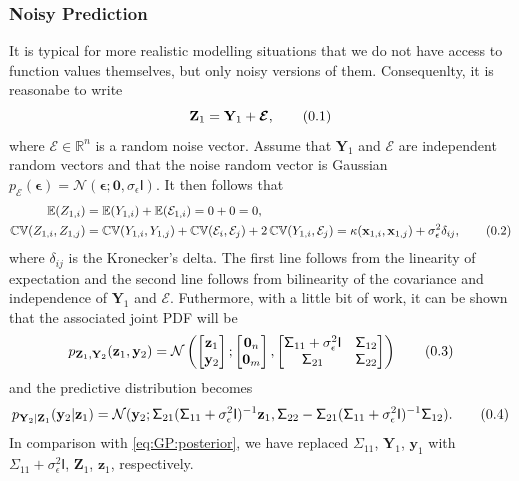 \documentclass[10pt]{article}
\theoremstyle{definition}
\newcommand\eqnum{\addtocounter{equation}{1}\tag{\arabic{section}.\arabic{equation}}}
\DeclareMathOperator{\cov}{\mathbb{CV}}
\begin{document}
\subsubsection{Noisy Prediction}
It is typical for more realistic modelling situations that we do not have access to function values themselves, but only noisy versions of them. Consequenlty, it is reasonabe to write
\begin{equation*}
\mathbf{Z}_{1} = \mathbf{Y}_{1} + \boldsymbol{\mathcal{E}},
\eqnum
\end{equation*}
where $\boldsymbol{\mathcal{E}}\in\mathbb{R}^n$ is a random noise vector. Assume that $\mathbf{Y}_1$ and $\boldsymbol{\mathcal{E}}$ are independent random vectors and that the noise random vector is Gaussian $p_{\boldsymbol{\mathcal{E}}}(\boldsymbol{\epsilon})=\mathcal{N}(\boldsymbol{\epsilon}; \mathbf{0}, \sigma_{\epsilon}\mathsf{I})$. It then follows that
 \begin{align*}
 \mathbb{E}(Z_{1,i}) &=  \mathbb{E}(Y_{1,i}) +  \mathbb{E}(\mathcal{E}_{1,i}) = 0 + 0 = 0, \\
 \cov(Z_{1,i},Z_{1,j}) &=  \cov(Y_{1,i},Y_{1,j}) +  \cov(\mathcal{E}_{i},\mathcal{E}_{j}) + 2 \cov(Y_{1,i},\mathcal{E}_{j}) = 
 \kappa(\mathbf{x}_{1,i}, \mathbf{x}_{1,j}) + \sigma_{\epsilon}^2\delta_{ij},
 \eqnum
 \end{align*}
where $\delta_{ij}$ is the Kronecker's delta. The first line follows from the linearity of expectation and the second line follows from bilinearity of the covariance and independence of $\mathbf{Y}_1$ and $\boldsymbol{\mathcal{E}}$. Futhermore, with a little bit of work, it can be shown that the associated joint PDF will be \cite[Sectoin 4.3]{Murphy2012}
\begin{equation*}
p_{\mathbf{Z}_{1}, \mathbf{Y}_{2}}(\mathbf{z}_{1}, \mathbf{y}_{2}) =
\mathcal{N} \left(
\begin{bmatrix}
\mathbf{z}_1 \\
\mathbf{y}_2
\end{bmatrix} ;
\begin{bmatrix}
\mathbf{0}_n \\
\mathbf{0}_m
\end{bmatrix} ,
\begin{bmatrix}
\mathsf{\Sigma}_{11}+\sigma_{\epsilon}^2\mathsf{I} & \mathsf{\Sigma}_{12} \\
\mathsf{\Sigma}_{21} & \mathsf{\Sigma}_{22} 
\end{bmatrix}
\right) 
\eqnum
\label{eq:GP:noise:joint}
\end{equation*}
and the predictive distribution becomes
\begin{equation*}
p_{\mathbf{Y}_2|\mathbf{Z}_1}(\mathbf{y}_2|\mathbf{z}_1) =
\mathcal{N}(\mathbf{y}_2; 
\mathsf{\Sigma}_{21}(\mathsf{\Sigma}_{11} + \sigma_{\epsilon}^2\mathsf{I})^{-1}\mathbf{z}_1, 
\mathsf{\Sigma}_{22} - \mathsf{\Sigma}_{21} (\mathsf{\Sigma}_{11}+\sigma_{\epsilon}^2\mathsf{I})^{-1} \mathsf{\Sigma}_{12}).
\eqnum
\label{eq:GP:posterior:noise}
\end{equation*}
In comparison with \cref{eq:GP:posterior}, we have replaced $\mathsf{\Sigma}_{11}$, $\mathbf{Y}_1$,  $\mathbf{y}_1$ with $\mathsf{\Sigma}_{11}+\sigma_{\epsilon}^2\mathsf{I}$,  $\mathbf{Z}_1$, $\mathbf{z}_1$, respectively.
\end{document}
